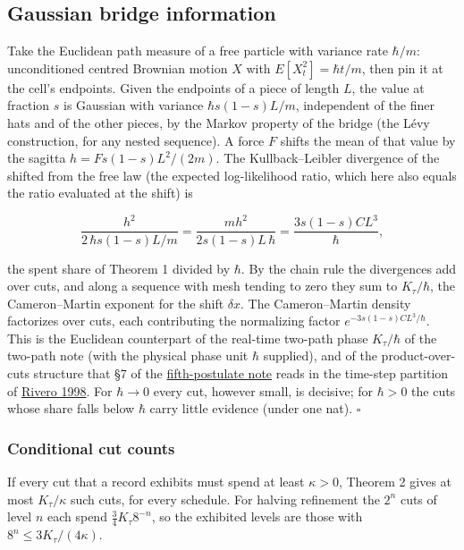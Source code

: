 \documentclass[11pt,a4paper]{article}
\begin{document}
\hypertarget{gaussian-bridge-information}{%
\subsection{Gaussian bridge
information}\label{gaussian-bridge-information}}

Take the Euclidean path measure of a free particle with variance rate
\(\hbar/m\): unconditioned centred Brownian motion \(X\) with
\(E[X_t^2]=\hbar t/m\), then pin it at the cell's endpoints. Given the
endpoints of a piece of length \(L\), the value at fraction \(s\) is
Gaussian with variance \(\hbar s(1-s)L/m\), independent of the finer
hats and of the other pieces, by the Markov property of the bridge (the
Lévy construction, for any nested sequence). A force \(F\) shifts the
mean of that value by the sagitta \(h=Fs(1-s)L^2/(2m)\). The
Kullback--Leibler divergence of the shifted from the free law (the
expected log-likelihood ratio, which here also equals the ratio
evaluated at the shift) is

\[\frac{h^2}{2\,\hbar s(1-s)L/m}=\frac{mh^2}{2s(1-s)L\,\hbar}
=\frac{3s(1-s)CL^3}{\hbar},\]

the spent share of Theorem 1 divided by \(\hbar\). By the chain rule the
divergences add over cuts, and along a sequence with mesh tending to
zero they sum to \(K_\tau/\hbar\), the Cameron--Martin exponent for the
shift \(\delta x\). The Cameron--Martin density factorizes over cuts,
each contributing the normalizing factor \(e^{-3s(1-s)CL^3/\hbar}\).
This is the Euclidean counterpart of the real-time two-path phase
\(K_\tau/\hbar\) of the two-path note (with the physical phase unit
\(\hbar\) supplied), and of the product-over-cuts structure that §7 of
the \href{principia-fifth-postulate.md}{fifth-postulate note} reads in
the time-step partition of
\href{https://arxiv.org/abs/quant-ph/9803035}{Rivero 1998}. For
\(\hbar\to0\) every cut, however small, is decisive; for \(\hbar>0\) the
cuts whose share falls below \(\hbar\) carry little evidence (under one
nat). \(\square\)

\hypertarget{conditional-cut-counts}{%
\subsubsection{Conditional cut counts}\label{conditional-cut-counts}}

If every cut that a record exhibits must spend at least \(\kappa>0\),
Theorem 2 gives at most \(K_\tau/\kappa\) such cuts, for every schedule.
For halving refinement the \(2^n\) cuts of level \(n\) each spend
\(\frac34K_\tau8^{-n}\), so the exhibited levels are those with
\(8^n\le 3K_\tau/(4\kappa)\).
\end{document}

